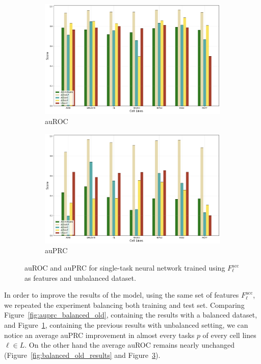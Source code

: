 \begin{figure}[!htbp]
    \centering
    \begin{subfigure}[b]{\textwidth}
        \includegraphics[width=\textwidth]{images/results_plots/single_tasks/unbalanced_old_auroc.png}
        \caption{auROC}
        \label{fig:auroc_unbalanced_old}
    \end{subfigure}
    \begin{subfigure}[b]{\textwidth}
        \includegraphics[width=\textwidth]{images/results_plots/single_tasks/unbalanced_old_auprc.png}
        \caption{auPRC}
        \label{fig:auprc_unbalanced_old}
    \end{subfigure}
    \caption{auROC and auPRC for single-task neural network trained using $F_\ell^{\textrm{acc}}$ as features and unbalanced dataset.}\label{fig:unbalanced_old_results}
\end{figure}

In order to improve the results of the model, using the same set of features $F_\ell^{\textrm{acc}}$, we repeated the experiment balancing both training and test set. Comparing Figure~\ref{fig:auprc_balanced_old}, containing the results with a balanced dataset, and Figure~\ref{fig:auroc_unbalanced_old}, containing the previous results with unbalanced setting, we can notice an average auPRC improvement in almost every tasks $p$ of every cell lines $\ell \in L$. On the other hand the average auROC remains nearly unchanged (Figure~\ref{fig:balanced_old_results} and Figure~\ref{fig:unbalanced_old_results}). 

